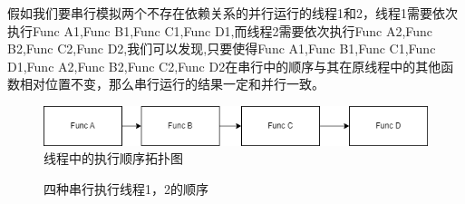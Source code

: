假如我们要串行模拟两个不存在依赖关系的并行运行的线程1和2，线程1需要依次执行Func A1,Func B1,Func C1,Func D1,而线程2需要依次执行Func A2,Func B2,Func C2,Func D2,我们可以发现,只要使得Func A1,Func B1,Func C1,Func D1,Func A2,Func B2,Func C2,Func D2在串行中的顺序与其在原线程中的其他函数相对位置不变，那么串行运行的结果一定和并行一致。
\begin{figure}[h]
    \centering
    \includegraphics[width=.5\textwidth]{figure/threadtopo.png}
    \caption{线程中的执行顺序拓扑图}
    \label{fig:thread topo}
\end{figure}
\begin{figure}[ht]
    \centering
    \caption{四种串行执行线程1，2的顺序}
    \label{fig:sequences}
\end{figure}




